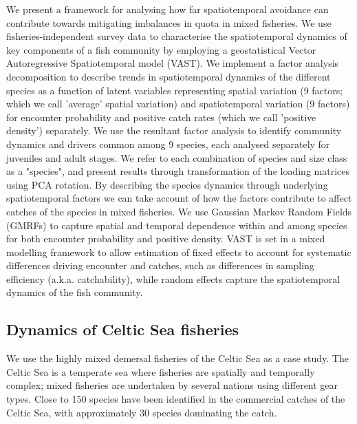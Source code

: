 \documentclass[fleqn,10pt]{wlscirep}
\begin{document}
\begin{linenumbers}
We present a framework for analysing how far spatiotemporal avoidance can
contribute towards mitigating imbalances in quota in mixed fisheries. We use
fisheries-independent survey data to characterise the spatiotemporal dynamics
of key components of a fish community by employing a geostatistical Vector
Autoregressive Spatiotemporal model (VAST). We implement a factor analysis
decomposition to describe trends in spatiotemporal dynamics of the different
species as a function of latent variables\cite{Thorson2015} representing
spatial variation (9 factors; which we call 'average' spatial variation) and
spatiotemporal variation (9 factors) for encounter probability and positive
catch rates (which we call 'positive density') separately\cite{Thorson2015a}.
We use the resultant factor analysis to identify community dynamics and drivers
common among 9 species, each analysed separately for juveniles and adult
stages.  We refer to each combination of species and size class as a
"species", and present results through transformation of
the loading matrices using PCA rotation. By describing the species dynamics
through underlying  spatiotemporal factors we can
take account of how the factors contribute to affect catches of the species in
mixed fisheries.  We use Gaussian Markov Random Fields (GMRFs) to capture
spatial and temporal dependence within and among species for both encounter probability and positive
density\cite{Thorson2013}. VAST is set in a mixed modelling framework to allow
estimation of fixed effects to account for systematic differences driving
encounter and catches, such as differences in sampling efficiency (a.k.a.
catchability), while random effects capture the spatiotemporal dynamics of the
fish community.\\

\subsection*{Dynamics of Celtic Sea fisheries\\}

We use the highly mixed demersal fisheries of the Celtic Sea as a case study.
The Celtic Sea is a temperate sea where fisheries are spatially and temporally
complex; mixed fisheries are undertaken by several nations using different gear
types\cite{Ellis2000, Gerritsen2012}. Close to 150 species have been
identified in the commercial catches of the Celtic Sea, with approximately 30
species dominating the catch\cite{Mateo2016}.\\


\end{linenumbers}
\end{document}
